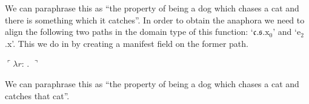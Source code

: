 We can paraphrase this as ``the property of being a dog which chases a
cat and there is something which it catches''.  In order to obtain the
anaphora we need to align the following two paths in the domain type
of this function: `$\mathfrak{c}.\mathfrak{s}.\text{x}_0$' and
`e$_2$.x'.  This we do in \nexteg{} by creating a manifest field on
the former path.

\begin{ex} 
  $\ulcorner\lambda r$:
   .
  $\urcorner$
\end{ex}
We can paraphrase this as ``the property of being a dog which chases a
cat and catches that cat''.


